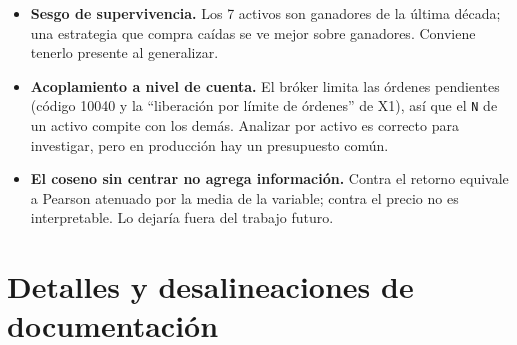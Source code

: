 \documentclass[11pt,a4paper]{article}
\newcommand{\code}[1]{\texttt{\small #1}}
\begin{document}
\begin{itemize}[leftmargin=1.2em]
        historial; esa familia no participa de facto. Conviene sacarla formalmente del alcance.
  \item \textbf{Sesgo de supervivencia.} Los 7 activos son ganadores de la última década; una estrategia
        que compra caídas se ve mejor sobre ganadores. Conviene tenerlo presente al generalizar.
  \item \textbf{Acoplamiento a nivel de cuenta.} El bróker limita las órdenes pendientes (código 10040 y
        la ``liberación por límite de órdenes'' de X1), así que el \code{N} de un activo compite con los
        demás. Analizar por activo es correcto para investigar, pero en producción hay un presupuesto común.
  \item \textbf{El coseno sin centrar no agrega información.} Contra el retorno equivale a Pearson
        atenuado por la media de la variable; contra el precio no es interpretable. Lo dejaría fuera del
        trabajo futuro.
\end{itemize}

\section{Detalles y desalineaciones de documentación}
\end{document}
